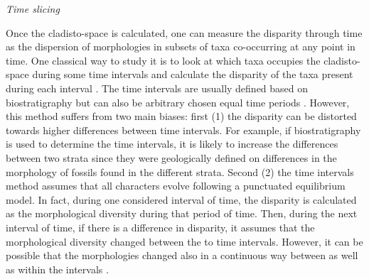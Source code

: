 \documentclass[12pt,letterpaper]{article}
\renewcommand{\subsection}[1]{%
\bigskip
\begin{center}
\begin{large}
\normalfont\itshape #1
\end{large}
\end{center}}
\begin{document}
\subsection{Time slicing}
Once the cladisto-space is calculated, one can measure the disparity through time as the dispersion of morphologies in subsets of taxa co-occurring at any point in time.
One classical way to study it is to look at which taxa occupies the cladisto-space during some time intervals and calculate the disparity of the taxa present during each interval \citep[e.g][]{cisneros2010,prentice2011,Hughes20082013,hopkinsdecoupling2013,bentonmodels2014,bensonfaunal2014}.
The time intervals are usually defined based on biostratigraphy \citep[e.g.][]{cisneros2010,prentice2011,Hughes20082013,bentonmodels2014} but can also be arbitrary chosen equal time periods \citep{hopkinsdecoupling2013,bensonfaunal2014}.
However, this method suffers from two main biases: first (1) the disparity can be distorted towards higher differences between time intervals.
For example, if biostratigraphy is used to determine the time intervals, it is likely to increase the differences between two strata since they were geologically defined on differences in the morphology of fossils found in the different strata.
Second (2) the time intervals method assumes that all characters evolve following a punctuated equilibrium model.
In fact, during one considered interval of time, the disparity is calculated as the morphological diversity during that period of time.
Then, during the next interval of time, if there is a difference in disparity, it assumes that the morphological diversity changed between the to time intervals.
However, it can be possible that the morphologies changed also in a continuous way between as well as within the intervals \citep{Hunt21042015}.
\end{document}
